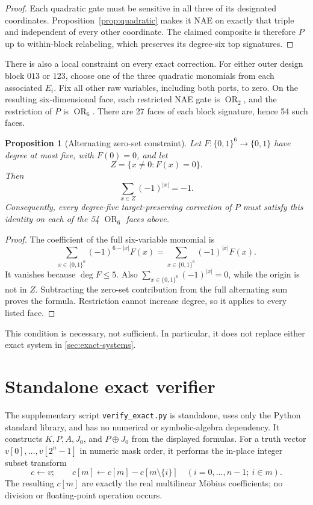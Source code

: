 \documentclass[11pt]{article}
\newtheorem{proposition}[theorem]{Proposition}
\theoremstyle{definition}
\newcommand{\cube}[1]{\{0,1\}^{#1}}
\newcommand{\OR}{\operatorname{OR}}
\begin{document}
\begin{proof}
Each quadratic gate must be sensitive in all three of its designated
coordinates.  Proposition~\ref{prop:quadratic} makes it NAE on exactly that
triple and independent of every other coordinate.  The claimed composite is
therefore \(P\) up to within-block relabeling, which preserves its degree-six
top signatures.
\end{proof}

There is also a local constraint on every exact correction.  For either outer
design block \(013\) or \(123\), choose one of the three quadratic monomials
from each associated \(E_i\).  Fix all other raw variables, including both
ports, to zero.  On the resulting six-dimensional face, each restricted NAE
gate is \(\OR_2\), and the restriction of \(P\) is \(\OR_6\).  There are 27
faces of each block signature, hence 54 such faces.

\begin{proposition}[Alternating zero-set constraint]\label{prop:or6}
Let \(F:\cube6\to\{0,1\}\) have degree at most five, with \(F(0)=0\), and
let
\[
 Z=\{x\ne0:F(x)=0\}.
\]
Then
\[
 \sum_{x\in Z}(-1)^{|x|}=-1.
\]
Consequently, every degree-five target-preserving correction of \(P\) must
satisfy this identity on each of the 54 \(\OR_6\) faces above.
\end{proposition}

\begin{proof}
The coefficient of the full six-variable monomial is
\[
 \sum_{x\in\cube6}(-1)^{6-|x|}F(x)
 =\sum_{x\in\cube6}(-1)^{|x|}F(x).
\]
It vanishes because \(\deg F\le5\).  Also
\(\sum_{x\in\cube6}(-1)^{|x|}=0\), while the origin is not in \(Z\).
Subtracting the zero-set contribution from the full alternating sum proves
the formula.  Restriction cannot increase degree, so it applies to every
listed face.
\end{proof}

This condition is necessary, not sufficient.  In particular, it does not
replace either exact system in \cref{sec:exact-systems}.

\section{Standalone exact verifier}\label{sec:verifier}

The supplementary script \texttt{verify\_exact.py} is standalone, uses only
the Python standard library, and has no numerical or symbolic-algebra
dependency.  It constructs \(K,P,A,J_0\), and \(P\oplus J_0\) from the
displayed formulas.  For a truth vector \(v[0],\ldots,v[2^n-1]\) in numeric
mask order, it performs the in-place integer subset transform
\[
 c\leftarrow v;\qquad
 c[m]\leftarrow c[m]-c[m\setminus\{i\}]
 \quad(i=0,\ldots,n-1;\ i\in m).
\]
The resulting \(c[m]\) are exactly the real multilinear M\"obius
coefficients; no division or floating-point operation occurs.
\end{document}
